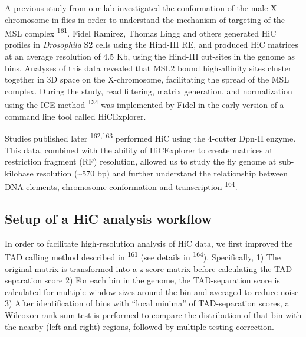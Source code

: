 \documentclass[11pt,twoside]{MPIthesis}
\theoremstyle{definition}
\theoremstyle{definition}
\theoremstyle{definition}
\theoremstyle{remark}
\begin{document}
A previous study from our lab investigated the conformation of the male
X-chromosome in flies in order to understand the mechanism of targeting
of the MSL complex \textsuperscript{161}. Fidel Ramirez, Thomas Lingg
and others generated HiC profiles in \emph{Drosophila} S2 cells using
the Hind-III RE, and produced HiC matrices at an average resolution of
4.5 Kb, using the Hind-III cut-sites in the genome as bins. Analyses of
this data revealed that MSL2 bound high-affinity sites cluster together
in 3D space on the X-chromosome, facilitating the spread of the MSL
complex. During the study, read filtering, matrix generation, and
normalization using the ICE method \textsuperscript{134} was implemented
by Fidel in the early version of a command line tool called HiCExplorer.

Studies published later \textsuperscript{162,163} performed HiC using
the 4-cutter Dpn-II enzyme. This data, combined with the ability of
HiCExplorer to create matrices at restriction fragment (RF) resolution,
allowed us to study the fly genome at sub-kilobase resolution
(\textasciitilde{}570 bp) and further understand the relationship
between DNA elements, chromosome conformation and transcription
\textsuperscript{164}.

\subsection{Setup of a HiC analysis
workflow}\label{setup-of-a-hic-analysis-workflow}

In order to facilitate high-resolution analysis of HiC data, we first
improved the TAD calling method described in \textsuperscript{161} (see
details in \textsuperscript{164}). Specifically, 1) The original matrix
is transformed into a z-score matrix before calculating the
TAD-separation score 2) For each bin in the genome, the TAD-separation
score is calculated for multiple window sizes around the bin and
averaged to reduce noise 3) After identification of bins with ``local
minima'' of TAD-separation scores, a Wilcoxon rank-sum test is performed
to compare the distribution of that bin with the nearby (left and right)
regions, followed by multiple testing correction.
\end{document}
